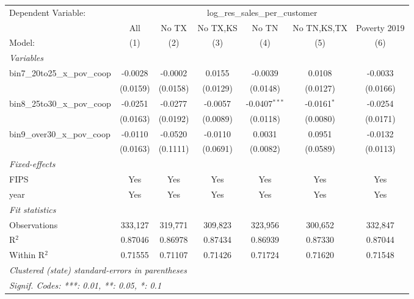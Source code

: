 
\begingroup
\centering
\begin{tabular}{lcccccc}
   \tabularnewline \midrule \midrule
   Dependent Variable: & \multicolumn{6}{c}{log\_res\_sales\_per\_customer}\\
                                  & All      & No TX    & No TX,KS & No TN           & No TN,KS,TX   & Poverty 2019 \\   
   Model:                         & (1)      & (2)      & (3)      & (4)             & (5)           & (6)\\  
   \midrule
   \emph{Variables}\\
   bin7\_20to25\_x\_pov\_coop     & -0.0028  & -0.0002  & 0.0155   & -0.0039         & 0.0108        & -0.0033\\   
                                  & (0.0159) & (0.0158) & (0.0129) & (0.0148)        & (0.0127)      & (0.0166)\\   
   bin8\_25to30\_x\_pov\_coop     & -0.0251  & -0.0277  & -0.0057  & -0.0407$^{***}$ & -0.0161$^{*}$ & -0.0254\\   
                                  & (0.0163) & (0.0192) & (0.0089) & (0.0118)        & (0.0080)      & (0.0171)\\   
   bin9\_over30\_x\_pov\_coop     & -0.0110  & -0.0520  & -0.0110  & 0.0031          & 0.0951        & -0.0132\\   
                                  & (0.0163) & (0.1111) & (0.0691) & (0.0082)        & (0.0589)      & (0.0113)\\   
   \midrule
   \emph{Fixed-effects}\\
   FIPS                           & Yes      & Yes      & Yes      & Yes             & Yes           & Yes\\  
   year                           & Yes      & Yes      & Yes      & Yes             & Yes           & Yes\\  
   \midrule
   \emph{Fit statistics}\\
   Observations                   & 333,127  & 319,771  & 309,823  & 323,956         & 300,652       & 332,847\\  
   R$^2$                          & 0.87046  & 0.86978  & 0.87434  & 0.86939         & 0.87330       & 0.87044\\  
   Within R$^2$                   & 0.71555  & 0.71107  & 0.71426  & 0.71724         & 0.71620       & 0.71548\\  
   \midrule \midrule
   \multicolumn{7}{l}{\emph{Clustered (state) standard-errors in parentheses}}\\
   \multicolumn{7}{l}{\emph{Signif. Codes: ***: 0.01, **: 0.05, *: 0.1}}\\
\end{tabular}
\par\endgroup


